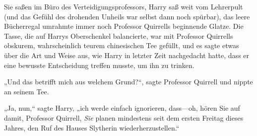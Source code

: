 Sie saßen im Büro des Verteidigungsprofessors, Harry saß weit vom Lehrerpult (und das Gefühl des drohenden Unheils war selbst dann noch spürbar), das leere Bücherregal umrahmte immer noch Professor Quirrells beginnende Glatze. Die Tasse, die auf Harrys Oberschenkel balancierte, war mit Professor Quirrells obskurem, wahrscheinlich teurem chinesischen Tee gefüllt, und es sagte etwas über die Art und Weise aus, wie Harry in letzter Zeit nachgedacht hatte, dass er eine bewusste Entscheidung treffen musste, um ihn zu trinken.

„Und das betrifft mich aus welchem Grund?“, sagte Professor Quirrell und nippte an seinem Tee.

„Ja, nun,“ sagte Harry, „ich werde einfach ignorieren, dass—oh, hören Sie auf damit, Professor Quirrell, \emph{Sie} planen mindestens seit dem ersten Freitag dieses Jahres, den Ruf des Hauses Slytherin wiederherzustellen.“

